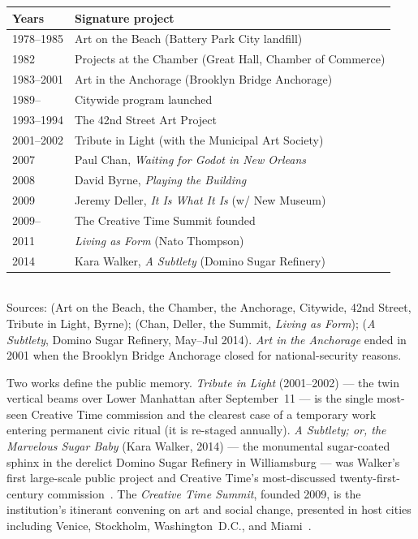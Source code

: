 \documentclass[10pt,letterpaper,twocolumn]{article}
\begin{document}
\begin{table}[h]
\footnotesize
\centering
\setlength{\tabcolsep}{3pt}
\begin{tabularx}{\columnwidth}{lX}
\toprule
\textbf{Years} & \textbf{Signature project} \\
\midrule
1978--1985 & Art on the Beach (Battery Park City landfill) \\
1982 & Projects at the Chamber (Great Hall, Chamber of Commerce) \\
1983--2001 & Art in the Anchorage (Brooklyn Bridge Anchorage) \\
1989-- & Citywide program launched \\
1993--1994 & The 42nd Street Art Project \\
2001--2002 & Tribute in Light (with the Municipal Art Society) \\
2007 & Paul Chan, \emph{Waiting for Godot in New Orleans} \\
2008 & David Byrne, \emph{Playing the Building} \\
2009 & Jeremy Deller, \emph{It Is What It Is} (w/ New Museum) \\
2009-- & The Creative Time Summit founded \\
2011 & \emph{Living as Form} (Nato Thompson) \\
2014 & Kara Walker, \emph{A Subtlety} (Domino Sugar Refinery) \\
\bottomrule
\end{tabularx}
\\[0.3em]
\footnotesize Sources: \citet{ctfales} (Art on the Beach, the Chamber, the Anchorage, Citywide, 42nd Street, Tribute in Light, Byrne); \citet{ctwiki} (Chan, Deller, the Summit, \emph{Living as Form}); \citet{ctkarawalker} (\emph{A Subtlety}, Domino Sugar Refinery, May--Jul 2014). \emph{Art in the Anchorage} ended in 2001 when the Brooklyn Bridge Anchorage closed for national-security reasons.
\end{table}

Two works define the public memory. \emph{Tribute in Light} (2001--2002) --- the twin vertical beams over Lower Manhattan after September~11 --- is the single most-seen Creative Time commission and the clearest case of a temporary work entering permanent civic ritual (it is re-staged annually). \emph{A Subtlety; or, the Marvelous Sugar Baby} (Kara Walker, 2014) --- the monumental sugar-coated sphinx in the derelict Domino Sugar Refinery in Williamsburg --- was Walker's first large-scale public project and Creative Time's most-discussed twenty-first-century commission~\citep{ctkarawalker,ctwiki}. The \emph{Creative Time Summit}, founded 2009, is the institution's itinerant convening on art and social change, presented in host cities including Venice, Stockholm, Washington~D.C., and Miami~\citep{ctabout}.
\end{document}
